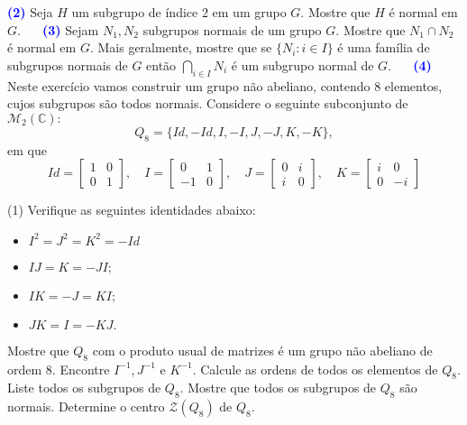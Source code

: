 \documentclass[12pt, a4paper]{article}
\newcommand{\negrito}[1]{\mbox{\boldmath{$#1$}}}
\begin{document}
\textcolor{blue}{\bf(2)}\label{40} Seja $H$ um subgrupo de índice $2$ em um grupo $G.$ Mostre que $H$ é normal em $G.$ 
\textcolor{white}{Oi}\newline\newline
\textcolor{blue}{\bf(3)}\label{41} Sejam $N_1, N_2$ subgrupos normais de um grupo $G.$ Mostre que $N_1 \cap N_2$ é normal em $G.$ Mais geralmente, mostre que se $\{N_i : i \in I \}$ é uma família de subgrupos normais de $G$ então $\bigcap\limits_{i \in I} N_i$ é um subgrupo normal de $G.$
\textcolor{white}{Oi}\newline\newline
\textcolor{blue}{\bf(4)}\label{42} Neste exercício vamos construir um grupo não abeliano, contendo $8$ elementos, cujos subgrupos são todos normais. Considere o seguinte subconjunto de $\mathcal{M}_2(\mathbb{C}):$
\[
Q_8 = \{Id,-Id, I, -I, J, -J, K, -K\},
\]
em que
\[
Id = \left[\begin{array}{cc} 1 & 0 \\ 0 & 1 \end{array}\right], \quad I = \left[\begin{array}{cc} 0 & 1 \\ -1 & 0 \end{array}\right],  \quad J = \left[\begin{array}{cc} 0 & i \\ i & 0 \end{array}\right], \quad K = \left[\begin{array}{cc} i & 0 \\ 0 & -i \end{array}\right] 
\]
\begin{tasks}[counter-format={(tsk[a])},label-width=3.6ex, label-format = {\bfseries}, column-sep = {0pt}](1)
\task[\textcolor{Floresta}{$\negrito{(a)} $}] Verifique as seguintes identidades abaixo:
\begin{itemize}
\item $I^2 = J^2 = K^2 = -Id$
\item $IJ = K = -JI;$
\item $IK = -J = KI;$
\item $JK = I = -KJ.$
\end{itemize}
\task[\textcolor{Floresta}{$\negrito{(b)} $}] Mostre que $Q_8$ com o produto usual de matrizes é um grupo não abeliano de ordem $8.$
\task[\textcolor{Floresta}{$\negrito{(c)} $}] Encontre $I^{-1}, J^{-1}$ e $K^{-1}.$
\task[\textcolor{Floresta}{$\negrito{(d)} $}] Calcule as ordens de todos os elementos de $Q_8.$
\task[\textcolor{Floresta}{$\negrito{(e)} $}] Liste todos os subgrupos de $Q_8.$
\task[\textcolor{Floresta}{$\negrito{(f)} $}] Mostre que todos os subgrupos de $Q_8$ são normais.
\task[\textcolor{Floresta}{$\negrito{(g)} $}] Determine o centro $\mathcal{Z}(Q_8)$ de $Q_8.$
\end{tasks}
\end{document}

